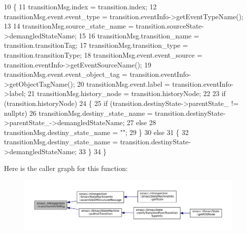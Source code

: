 \begin{DoxyCode}
10 \{
11     transitionMsg.index = transition.index;
12     transitionMsg.event.event\_type = transition.eventInfo->getEventTypeName();
13 
14     transitionMsg.source\_state\_name = transition.sourceState->demangledStateName;
15 
16     transitionMsg.transition\_name = transition.transitionTag;
17     transitionMsg.transition\_type = transition.transitionType;
18     transitionMsg.event.event\_source = transition.eventInfo->getEventSourceName();
19     transitionMsg.event.event\_object\_tag = transition.eventInfo->getObjectTagName();
20     transitionMsg.event.label = transition.eventInfo->label;
21     transitionMsg.history\_node = transition.historyNode;
22 
23     \textcolor{keywordflow}{if} (transition.historyNode)
24     \{
25         \textcolor{keywordflow}{if} (transition.destinyState->parentState\_ != \textcolor{keyword}{nullptr})
26             transitionMsg.destiny\_state\_name = transition.destinyState->parentState\_->demangledStateName;
27         \textcolor{keywordflow}{else}
28             transitionMsg.destiny\_state\_name = \textcolor{stringliteral}{""};
29     \}
30     \textcolor{keywordflow}{else}
31     \{
32         transitionMsg.destiny\_state\_name = transition.destinyState->demangledStateName;
33     \}
34 \}
\end{DoxyCode}
Here is the caller graph for this function\+:
\nopagebreak
\begin{figure}[H]
\begin{center}
\leavevmode
\includegraphics[width=350pt]{namespacesmacc_1_1introspection_a6c1b51c4d44fd5e41fe218f1ee150681_icgraph}
\end{center}
\end{figure}

